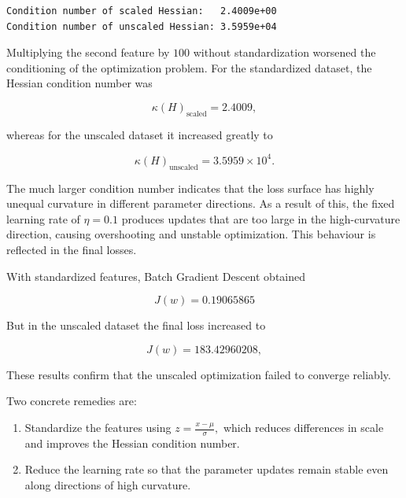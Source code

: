 \documentclass[11pt]{article}
\begin{document}
    \begin{Verbatim}[commandchars=\\\{\}]
Condition number of scaled Hessian:   2.4009e+00
Condition number of unscaled Hessian: 3.5959e+04
    \end{Verbatim}

    Multiplying the second feature by \(100\) without standardization
worsened the conditioning of the optimization problem. For the
standardized dataset, the Hessian condition number was

\[
\kappa(H)_{\mathrm{scaled}} = 2.4009,
\]

whereas for the unscaled dataset it increased greatly to

\[
\kappa(H)_{\mathrm{unscaled}}
=
3.5959\times10^4.
\]

The much larger condition number indicates that the loss surface has
highly unequal curvature in different parameter directions. As a result
of this, the fixed learning rate of \(\eta=0.1\) produces updates that
are too large in the high-curvature direction, causing overshooting and
unstable optimization. This behaviour is reflected in the final losses.

With standardized features, Batch Gradient Descent obtained

\[
J(w)=0.19065865
\]

But in the unscaled dataset the final loss increased to

\[
J(w)=183.42960208,
\]

These results confirm that the unscaled optimization failed to converge
reliably.

Two concrete remedies are:

\begin{enumerate}
\def\labelenumi{\arabic{enumi}.}
\item
  Standardize the features using \(z=\frac{x-\mu}{\sigma},\) which
  reduces differences in scale and improves the Hessian condition
  number.
\item
  Reduce the learning rate so that the parameter updates remain stable
  even along directions of high curvature.
\end{enumerate}


    
    
    
\end{document}
